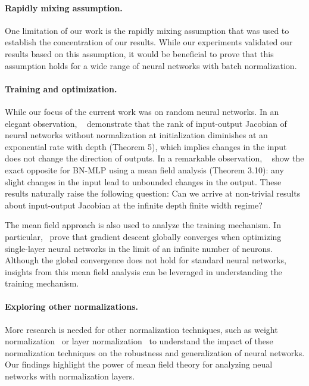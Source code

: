 \paragraph{Rapidly mixing assumption.}
One limitation of our work is the rapidly mixing assumption that was used to establish the concentration of our results. While our experiments validated our results based on this assumption, it would be beneficial to prove that this assumption holds for a wide range of neural networks with batch normalization.

\paragraph{Training and optimization.}
While our focus of the current work was on random neural networks. In an elegant observation, ~\citet{feng2022rank} demonstrate that the rank of input-output Jacobian of neural networks without normalization at initialization diminishes at an exponential rate with depth (Theorem 5), which implies changes in the input does not change the direction of outputs. In a remarkable observation, ~\citet{yang2018a} show the exact opposite for BN-MLP using a mean field analysis (Theorem 3.10): any slight changes in the input lead to unbounded changes in the output. These results naturally raise the following question: Can we arrive at non-trivial results about input-output Jacobian at the infinite depth finite width regime? 

The mean field approach is also used to analyze the training mechanism. In particular,~\citet{bach2021gradient} prove that gradient descent globally converges when optimizing single-layer neural networks in the limit of an infinite number of neurons. Although the global convergence does not hold for standard neural networks, insights from this mean field analysis can be leveraged in understanding the training mechanism.  

\paragraph{Exploring other normalizations.}
More research is needed for other normalization techniques, such as weight normalization~\cite{salimans2016weight} or layer normalization~\cite{ba2016layer} to understand the impact of these normalization techniques on the robustness and generalization of neural networks. Our findings highlight the power of mean field theory for analyzing neual networks with normalization layers.

